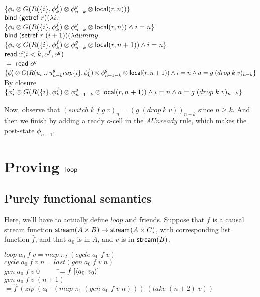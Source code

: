 \documentclass{article}
\begin{document}
\begin{tabbing}
$\{ \phi_i \otimes
  G(R(\{{i}\}, \phi^f_k) \otimes \phi^g_{n-k} \otimes 
  \mbox{\textsf{{local}}}({r}, {n}))
\}$ \\
$\mbox{\textsf{{bind}}}\; (\mbox{\textsf{{getref}}}\; r) (\lambda i.\;$ \\
$\{ \phi_i \otimes
  G(R(\{{i}\}, \phi^f_k) \otimes \phi^g_{n-k} \otimes 
  \mbox{\textsf{{local}}}({r}, {n}))
  \land i = n
\}$ \\
$\mbox{\textsf{{bind}}}\; (\mbox{\textsf{{setref}}}\; r\;(i+1)) (\lambda dummy.$ \\ 
$\{ \phi_i \otimes
  G(R(\{{i}\}, \phi^f_k) \otimes \phi^g_{n-k} \otimes 
  \mbox{\textsf{{local}}}({r}, {n+1}))
  \land i = n
\}$ \\
$\mbox{\textsf{{read}}}\; \mbox{if}(i < k, o^f, o^g)$ \\
$\equiv$
$\mbox{\textsf{{read}}}\; o^g$ \\
$\{ \phi'_i \otimes 
  G(R(u_i \cup u^g_{n-k} cup \{{i}\}, \phi^f_k) \otimes \phi^g_{n+1-k} \otimes 
  \mbox{\textsf{{local}}}({r}, {n+1}))
  \land i = n \land a = g\;(drop\;k\;v)_{n-k}
\}$ \\
By closure
$\{ \phi'_i \otimes 
  G(R(\{{i}\}, \phi^f_k) \otimes \phi^g_{n+1-k} \otimes 
  \mbox{\textsf{{local}}}({r}, {n+1}))
  \land i = n \land a = g\;(drop\;k\;v)_{n-k}
\}$ \\
\end{tabbing}

Now, observe that $(switch\;k\;f\;g\;v)_n = (g\;(drop\;k\;v))_{n-k}$ since $n \geq k$.
And then we finish by adding a ready $o$-cell in the $AUnready$ rule,
which makes the post-state $\phi_{n+1}$.

\section{Proving $\mbox{\textsf{{loop}}}\;$}

\subsection{Purely functional semantics}

Here, we'll have to actually define $loop$ and friends. Suppose that
$f$ is a causal stream function $\mbox{\textsf{{stream}}}({A \times B}) \to \mbox{\textsf{{stream}}}({A
  \times C})$, with corresponding list function $\hat{f}$, and that
$a_0$ is in $A$, and $v$ is in $\mbox{\textsf{{stream}}}({B})$.

\begin{tabbing}
  $loop\;a_0\;f\;v = map \; \pi_2 \; (cycle \;a_0 \; f \; v)$ \\[1em]

  $cycle\; a_0 \;f \;v \;n = last(gen\;a_0\;f\;v\;n)$ \\[1em]

  $gen\;a_0\;f\;v\;0\;\;\;\qquad$\=$= \hat{f}\;[\left<{a_0},{v_0}\right>]$ \\
  $gen\;a_0\;f\;v\;(n+1)$  \>$= \hat{f}\;(zip\;(a_0 \cdot (map\;\pi_1\;(gen\;a_0\;f\;v\;n)))\;
                                               (take\;(n+2)\;v))$ \\
\end{tabbing}
\end{document}
